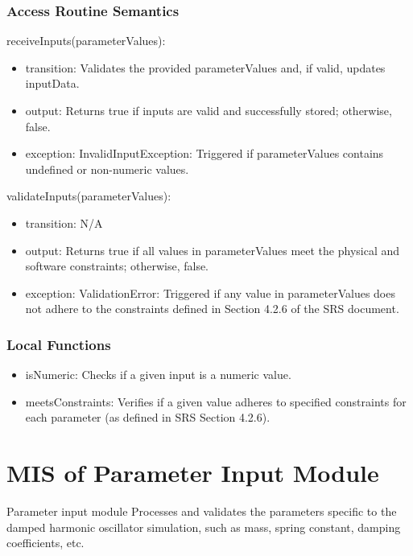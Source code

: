 \documentclass[12pt, titlepage]{article}
\begin{document}
\subsubsection{Access Routine Semantics}

\noindent receiveInputs(parameterValues):
\begin{itemize}
\item transition: Validates the provided parameterValues and, if valid, updates inputData.
\item output: Returns true if inputs are valid and successfully stored; otherwise, false.
\item exception: InvalidInputException: Triggered if parameterValues contains undefined or non-numeric values.
\end{itemize}

\noindent validateInputs(parameterValues):
\begin{itemize}
\item transition: N/A
\item output: Returns true if all values in parameterValues meet the physical and software constraints; otherwise, false.
\item exception: ValidationError: Triggered if any value in parameterValues does not adhere to the constraints defined in Section 4.2.6 of the SRS document.
\end{itemize}

\subsubsection{Local Functions}

\begin{itemize}
  \item isNumeric: Checks if a given input is a numeric value.
  \item meetsConstraints: Verifies if a given value adheres to specified constraints for each parameter (as defined in SRS Section 4.2.6).
\end{itemize}



\section{MIS of Parameter Input Module} \label{mPI}

Parameter input module Processes and validates the parameters specific to the damped harmonic oscillator
simulation, such as mass, spring constant, damping coefficients, etc.
\end{document}
